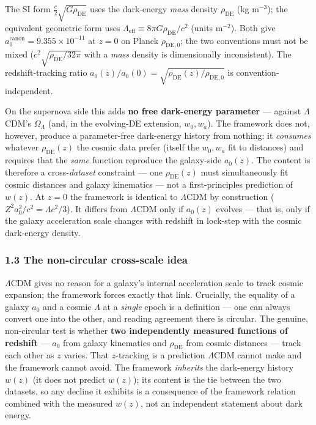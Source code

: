 \documentclass[
]{article}
\begin{document}
The SI form \(\tfrac{c}{2}\sqrt{G\rho_\mathrm{DE}}\) uses the dark-energy
\emph{mass} density \(\rho_\mathrm{DE}\) (kg m\(^{-3}\)); the equivalent
geometric form uses \(\Lambda_\mathrm{eff}\equiv8\pi G\rho_\mathrm{DE}/c^2\)
(units m\(^{-2}\)). Both give \(a_0^\mathrm{canon}=9.355\times10^{-11}\) at
\(z=0\) on Planck \(\rho_\mathrm{DE,0}\); the two conventions must not be
mixed (\(c^2\sqrt{\rho_\mathrm{DE}/32\pi}\) with a \emph{mass} density is
dimensionally inconsistent). The redshift-tracking ratio
\(a_0(z)/a_0(0)=\sqrt{\rho_\mathrm{DE}(z)/\rho_\mathrm{DE,0}}\) is
convention-independent.

On the supernova side this adds \textbf{no free dark-energy parameter}
--- against \(\Lambda\)CDM's \(\Omega_\Lambda\) (and, in the evolving-DE
extension, \(w_0,w_a\)). The framework does not, however, produce a
parameter-free dark-energy history from nothing: it \emph{consumes}
whatever \(\rho_\mathrm{DE}(z)\) the cosmic data prefer (itself the
\(w_0,w_a\) fit to distances) and requires that the \emph{same} function
reproduce the galaxy-side \(a_0(z)\). The content is therefore a
cross-\emph{dataset} constraint --- one \(\rho_\mathrm{DE}(z)\) must
simultaneously fit cosmic distances and galaxy kinematics --- not a
first-principles prediction of \(w(z)\). At \(z=0\) the framework is
identical to \(\Lambda\)CDM by construction
(\(Z^2a_0^2/c^2=\Lambda c^2/3\)). It differs from \(\Lambda\)CDM only if
\(a_0(z)\) evolves --- that is, only if the galaxy acceleration scale
changes with redshift in lock-step with the cosmic dark-energy density.

\subsubsection{1.3 The non-circular cross-scale
idea}\label{the-non-circular-cross-scale-idea}

\(\Lambda\)CDM gives no reason for a galaxy's internal acceleration
scale to track cosmic expansion; the framework forces exactly that link.
Crucially, the equality of a galaxy \(a_0\) and a cosmic \(\Lambda\) at
a \emph{single} epoch is a definition --- one can always convert one
into the other, and reading agreement there is circular. The genuine,
non-circular test is whether \textbf{two independently measured
functions of redshift} --- \(a_0\) from galaxy kinematics and
\(\rho_\mathrm{DE}\) from cosmic distances --- track each other as \(z\)
varies. That \(z\)-tracking is a prediction \(\Lambda\)CDM cannot make
and the framework cannot avoid. The framework \emph{inherits} the
dark-energy history \(w(z)\) (it does not predict \(w(z)\)); its content
is the tie between the two datasets, so any decline it exhibits is a
consequence of the framework relation combined with the measured
\(w(z)\), not an independent statement about dark energy.
\end{document}
